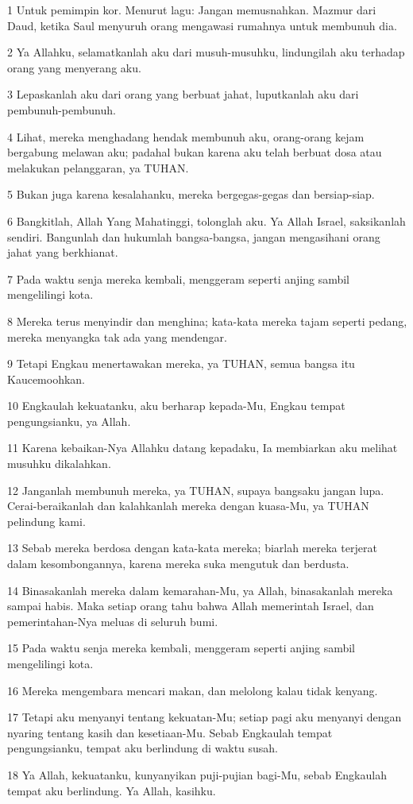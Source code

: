 \par 1 Untuk pemimpin kor. Menurut lagu: Jangan memusnahkan. Mazmur dari Daud, ketika Saul menyuruh orang mengawasi rumahnya untuk membunuh dia.
\par 2 Ya Allahku, selamatkanlah aku dari musuh-musuhku, lindungilah aku terhadap orang yang menyerang aku.
\par 3 Lepaskanlah aku dari orang yang berbuat jahat, luputkanlah aku dari pembunuh-pembunuh.
\par 4 Lihat, mereka menghadang hendak membunuh aku, orang-orang kejam bergabung melawan aku; padahal bukan karena aku telah berbuat dosa atau melakukan pelanggaran, ya TUHAN.
\par 5 Bukan juga karena kesalahanku, mereka bergegas-gegas dan bersiap-siap.
\par 6 Bangkitlah, Allah Yang Mahatinggi, tolonglah aku. Ya Allah Israel, saksikanlah sendiri. Bangunlah dan hukumlah bangsa-bangsa, jangan mengasihani orang jahat yang berkhianat.
\par 7 Pada waktu senja mereka kembali, menggeram seperti anjing sambil mengelilingi kota.
\par 8 Mereka terus menyindir dan menghina; kata-kata mereka tajam seperti pedang, mereka menyangka tak ada yang mendengar.
\par 9 Tetapi Engkau menertawakan mereka, ya TUHAN, semua bangsa itu Kaucemoohkan.
\par 10 Engkaulah kekuatanku, aku berharap kepada-Mu, Engkau tempat pengungsianku, ya Allah.
\par 11 Karena kebaikan-Nya Allahku datang kepadaku, Ia membiarkan aku melihat musuhku dikalahkan.
\par 12 Janganlah membunuh mereka, ya TUHAN, supaya bangsaku jangan lupa. Cerai-beraikanlah dan kalahkanlah mereka dengan kuasa-Mu, ya TUHAN pelindung kami.
\par 13 Sebab mereka berdosa dengan kata-kata mereka; biarlah mereka terjerat dalam kesombongannya, karena mereka suka mengutuk dan berdusta.
\par 14 Binasakanlah mereka dalam kemarahan-Mu, ya Allah, binasakanlah mereka sampai habis. Maka setiap orang tahu bahwa Allah memerintah Israel, dan pemerintahan-Nya meluas di seluruh bumi.
\par 15 Pada waktu senja mereka kembali, menggeram seperti anjing sambil mengelilingi kota.
\par 16 Mereka mengembara mencari makan, dan melolong kalau tidak kenyang.
\par 17 Tetapi aku menyanyi tentang kekuatan-Mu; setiap pagi aku menyanyi dengan nyaring tentang kasih dan kesetiaan-Mu. Sebab Engkaulah tempat pengungsianku, tempat aku berlindung di waktu susah.
\par 18 Ya Allah, kekuatanku, kunyanyikan puji-pujian bagi-Mu, sebab Engkaulah tempat aku berlindung. Ya Allah, kasihku.

